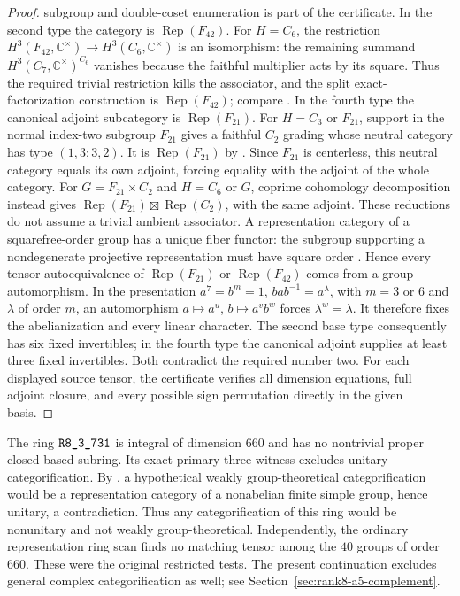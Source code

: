 \begin{proof}
subgroup and double-coset enumeration is part of the certificate.
In the second type the category is $\operatorname{Rep}(F_{42})$.
For $H=C_6$, the restriction $H^3(F_{42},\mathbb C^\times)\to
H^3(C_6,\mathbb C^\times)$ is an isomorphism: the remaining summand
$H^3(C_7,\mathbb C^\times)^{C_6}$ vanishes because the faithful
multiplier acts by its square. Thus the required trivial restriction
kills the associator, and the split exact-factorization construction
is $\operatorname{Rep}(F_{42})$; compare
\cite[Corollary~7.4]{EGODimPQ}.
In the fourth type the canonical adjoint subcategory is
$\operatorname{Rep}(F_{21})$. For $H=C_3$ or $F_{21}$, support in
the normal index-two subgroup $F_{21}$ gives a faithful $C_2$ grading
whose neutral category has type $(1,3;3,2)$. It is
$\operatorname{Rep}(F_{21})$ by \cite[Theorem~6.3]{EGODimPQ}.
Since $F_{21}$ is centerless, this neutral category equals its own
adjoint, forcing equality with the adjoint of the whole category.
For $G=F_{21}\times C_2$ and $H=C_6$ or $G$, coprime cohomology
decomposition instead gives
$\operatorname{Rep}(F_{21})\boxtimes\operatorname{Rep}(C_2)$,
with the same adjoint. These reductions do not assume a trivial
ambient associator.
A representation category of a squarefree-order group has a unique
fiber functor: the subgroup supporting a nondegenerate projective
representation must have square order
\cite[Section~3.4, Theorem~2 and Example~(i)]{OstrikModules}.
Hence every tensor autoequivalence of $\operatorname{Rep}(F_{21})$
or $\operatorname{Rep}(F_{42})$ comes from a group automorphism.
In the presentation $a^7=b^m=1$, $bab^{-1}=a^\lambda$, with
$m=3$ or $6$ and $\lambda$ of order $m$, an automorphism
$a\mapsto a^u$, $b\mapsto a^v b^w$ forces $\lambda^w=\lambda$.
It therefore fixes the abelianization and every linear character.
The second base type consequently has six fixed invertibles; in the
fourth type the canonical adjoint supplies at least three fixed
invertibles. Both contradict the required number two.
For each displayed source tensor, the certificate verifies all
dimension equations, full adjoint closure, and every possible sign
permutation directly in the given basis.
\end{proof}
\begin{remark}\label{rem:m3-r731}
The ring $\sha{R8_3_731}$ is integral of dimension $660$ and
has no nontrivial proper closed based subring. Its exact primary-three
witness excludes unitary categorification. By
\cite[Proposition~9.11]{ENOSolvable}, a hypothetical weakly
group-theoretical categorification would be a representation category
of a nonabelian finite simple group, hence unitary, a contradiction.
Thus any categorification of this ring would be nonunitary and not
weakly group-theoretical. Independently, the ordinary representation
ring scan finds no matching tensor among the $40$ groups of order
$660$. These were the original restricted tests. The present continuation excludes general complex categorification as well; see Section~\ref{sec:rank8-a5-complement}.
\end{remark}

